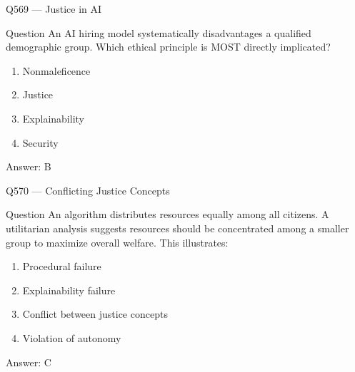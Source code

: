 \documentclass[aspectratio=169,8pt]{beamer}
\begin{document}
\begin{frame}{Q569 --- Justice in AI}
	\begin{block}{Question}
		An AI hiring model systematically disadvantages a qualified demographic group. Which ethical principle is MOST directly implicated?
		\begin{enumerate}
			\item Nonmaleficence
			\item Justice
			\item Explainability
			\item Security
		\end{enumerate}
	\end{block}
	
	\begin{exampleblock}{Answer: B}\end{exampleblock}
\end{frame}

\begin{frame}{Q570 --- Conflicting Justice Concepts}
	\begin{block}{Question}
		An algorithm distributes resources equally among all citizens. A utilitarian analysis suggests resources should be concentrated among a smaller group to maximize overall welfare. This illustrates:
		\begin{enumerate}
			\item Procedural failure
			\item Explainability failure
			\item Conflict between justice concepts
			\item Violation of autonomy
		\end{enumerate}
	\end{block}
	
	\begin{exampleblock}{Answer: C}\end{exampleblock}
\end{frame}
\end{document}
